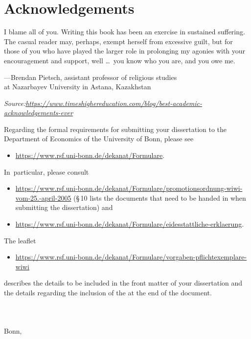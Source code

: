 \chapter{Acknowledgements}


I blame all of you. Writing this book has been an exercise in sustained suffering. The casual reader may, perhaps, exempt herself from excessive guilt, but for those of you who have played the larger role in prolonging my agonies with your encouragement and support, well \dots\ you know who you are, and you owe me.%

\RaggedLeft
---Brendan Pietsch, assistant professor of religious studies \\
at Nazarbayev University in Astana, Kazakhstan

\medskip

\textit{Source:\:\url{https://www.timeshighereducation.com/blog/best-academic-acknowledgements-ever}}

\justifying

\bigskip

\noindent%
Regarding the formal requirements for submitting your dissertation to the Department of Economics of the University of Bonn, please see
\begin{itemize}
	\item \url{https://www.rsf.uni-bonn.de/dekanat/Formulare}.
\end{itemize}  In~particular, please consult
\begin{itemize}
	\item \url{https://www.rsf.uni-bonn.de/dekanat/Formulare/promotionsordnung-wiwi-vom-25.-april-2005} (\S\,10 lists the documents that need to be handed in when submitting the dissertation) and
	\item \url{https://www.rsf.uni-bonn.de/dekanat/Formulare/eidesstattliche-erklaerung}.
\end{itemize}
The leaflet
\begin{itemize}
	\item \url{https://www.rsf.uni-bonn.de/dekanat/Formulare/vorgaben-pflichtexemplare-wiwi}
\end{itemize}
describes the details to be included in the front matter of your dissertation and the details regarding the inclusion of the  at the end of the document.
\\
\\
\\
\dissauthor \\
Bonn, \disssubmitdate